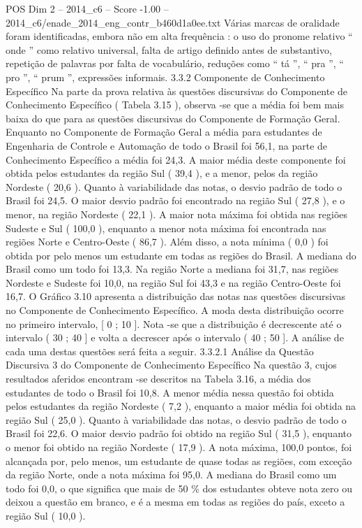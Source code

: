 \begin{textsample}{POS Dim 2 – 2014\_c6 – Score -1.00 – 2014\_c6/enade\_2014\_eng\_contr\_b460d1a0ee.txt}
Várias marcas de oralidade foram identificadas, embora não em alta frequência : o uso do pronome relativo “ onde ” como relativo universal, falta de artigo definido antes de substantivo, repetição de palavras por falta de vocabulário, reduções como “ tá ”, “ pra ”, “ pro ”, “ prum ”, expressões informais. 3.3.2 Componente de Conhecimento Específico Na parte da prova relativa às questões discursivas do Componente de Conhecimento Específico ( Tabela 3.15 ), observa -se que a média foi bem mais baixa do que para as questões discursivas do Componente de Formação Geral.
Enquanto no Componente de Formação Geral a média para estudantes de Engenharia de Controle e Automação de todo o Brasil foi 56,1, na parte de Conhecimento Específico a média foi 24,3.
A maior média deste componente foi obtida pelos estudantes da região Sul ( 39,4 ), e a menor, pelos da região Nordeste ( 20,6 ).
Quanto à variabilidade das notas, o desvio padrão de todo o Brasil foi 24,5.
O maior desvio padrão foi encontrado na região Sul ( 27,8 ), e o menor, na região Nordeste ( 22,1 ).
A maior nota máxima foi obtida nas regiões Sudeste e Sul ( 100,0 ), enquanto a menor nota máxima foi encontrada nas regiões Norte e Centro-Oeste ( 86,7 ).
Além disso, a nota mínima ( 0,0 ) foi obtida por pelo menos um estudante em todas as regiões do Brasil.
A mediana do Brasil como um todo foi 13,3.
Na região Norte a mediana foi 31,7, nas regiões Nordeste e Sudeste foi 10,0, na região Sul foi 43,3 e na região Centro-Oeste foi 16,7.
O Gráfico 3.10 apresenta a distribuição das notas nas questões discursivas no Componente de Conhecimento Específico.
A moda desta distribuição ocorre no primeiro intervalo, [ 0 ; 10 ].
Nota -se que a distribuição é decrescente até o intervalo ( 30 ; 40 ] e volta a decrescer após o intervalo ( 40 ; 50 ].
A análise de cada uma destas questões será feita a seguir. 3.3.2.1 Análise da Questão Discursiva 3 do Componente de Conhecimento Específico Na questão 3, cujos resultados aferidos encontram -se descritos na Tabela 3.16, a média dos estudantes de todo o Brasil foi 10,8.
A menor média nessa questão foi obtida pelos estudantes da região Nordeste ( 7,2 ), enquanto a maior média foi obtida na região Sul ( 25,0 ).
Quanto à variabilidade das notas, o desvio padrão de todo o Brasil foi 22,6.
O maior desvio padrão foi obtido na região Sul ( 31,5 ), enquanto o menor foi obtido na região Nordeste ( 17,9 ).
A nota máxima, 100,0 pontos, foi alcançada por, pelo menos, um estudante de quase todas as regiões, com exceção da região Norte, onde a nota máxima foi 95,0.
A mediana do Brasil como um todo foi 0,0, o que significa que mais de 50 \% dos estudantes obteve nota zero ou deixou a questão em branco, e é a mesma em todas as regiões do país, exceto a região Sul ( 10,0 ).

\end{textsample}
